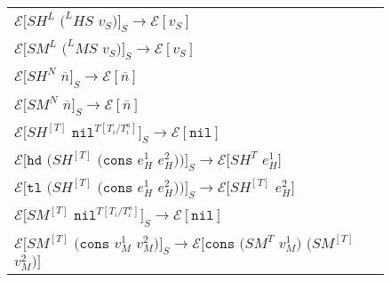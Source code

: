 \begin{figure}[p]
\centering
\begin{tabular}{l}
\vspace{5pt}

$\mathscr{E}[SH^{L}$ $(^{L}HS$ $v_{S})]_{S}\rightarrow\mathscr{E}[v_{S}]$ \\

\vspace{5pt}

$\mathscr{E}[SM^{L}$ $(^{L}MS$ $v_{S})]_{S}\rightarrow\mathscr{E}[v_{S}]$ \\

\vspace{5pt}

$\mathscr{E}[SH^{N}$ $\overline{n}]_{S}\rightarrow\mathscr{E}[\overline{n}]$ \\

\vspace{5pt}

$\mathscr{E}[SM^{N}$ $\overline{n}]_{S}\rightarrow\mathscr{E}[\overline{n}]$ \\

\vspace{5pt}

$\mathscr{E}[SH^{[T]}$ $\mathtt{nil}^{T[T_{i}/T_{i}^{a}]}]_{S}\rightarrow\mathscr{E}[\mathtt{nil}]$ \\

\vspace{5pt}

$\mathscr{E}[\mathtt{hd}$ $(SH^{[T]}$ $(\mathtt{cons}$ $e_{H}^{1}$ $e_{H}^{2}))]_{S}\rightarrow\mathscr{E}[SH^{T}$ $e_{H}^{1}]$ \\

\vspace{5pt}

$\mathscr{E}[\mathtt{tl}$ $(SH^{[T]}$ $(\mathtt{cons}$ $e_{H}^{1}$ $e_{H}^{2}))]_{S}\rightarrow\mathscr{E}[SH^{[T]}$ $e_{H}^{2}]$ \\

\vspace{5pt}

$\mathscr{E}[SM^{[T]}$ $\mathtt{nil}^{T[T_{i}/T_{i}^{a}]}]_{S}\rightarrow\mathscr{E}[\mathtt{nil}]$ \\

\vspace{5pt}

$\mathscr{E}[SM^{[T]}$ $(\mathtt{cons}$ $v_{M}^{1}$ $v_{M}^{2})]_{S}\rightarrow\mathscr{E}[\mathtt{cons}$ $(SM^{T}$ $v_{M}^{1})$ $(SM^{[T]}$ $v_{M}^{2})]$ \\


\end{tabular}
\end{figure}
